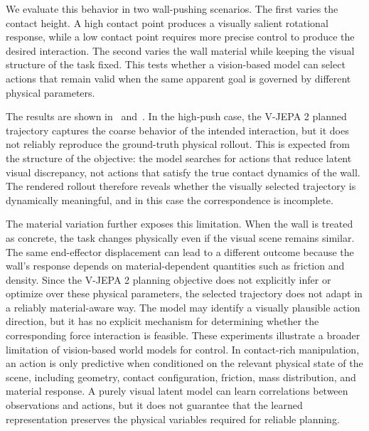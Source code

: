\documentclass{article}
\begin{document}
We evaluate this behavior in two wall-pushing scenarios. The first varies the contact height. 
A high contact point produces a visually salient rotational response, while a low contact point requires more precise control to produce the desired interaction. 
The second varies the wall material while keeping the visual structure of the task fixed. This tests whether a vision-based model can select actions that remain valid when the same apparent goal is governed by different physical parameters.

The results are shown in~ and~. 
In the high-push case, the V-JEPA 2 planned trajectory captures the coarse behavior of the intended interaction, but it does not reliably reproduce the ground-truth physical rollout. 
This is expected from the structure of the objective: the model searches for actions that reduce latent visual discrepancy, not actions that satisfy the true contact dynamics of the wall. 
The rendered rollout therefore reveals whether the visually selected trajectory is dynamically meaningful, and in this case the correspondence is incomplete.

The material variation further exposes this limitation. 
When the wall is treated as concrete, the task changes physically even if the visual scene remains similar. 
The same end-effector displacement can lead to a different outcome because the wall's response depends on material-dependent quantities such as friction and density. 
Since the V-JEPA 2 planning objective does not explicitly infer or optimize over these physical parameters, the selected trajectory does not adapt in a reliably material-aware way. 
The model may identify a visually plausible action direction, but it has no explicit mechanism for determining whether the corresponding force interaction is feasible.
These experiments illustrate a broader limitation of vision-based world models for control. 
In contact-rich manipulation, an action is only predictive when conditioned on the relevant physical state of the scene, including geometry, contact configuration, friction, mass distribution, and material response. 
A purely visual latent model can learn correlations between observations and actions, but it does not guarantee that the learned representation preserves the physical variables required for reliable planning.
\end{document}
